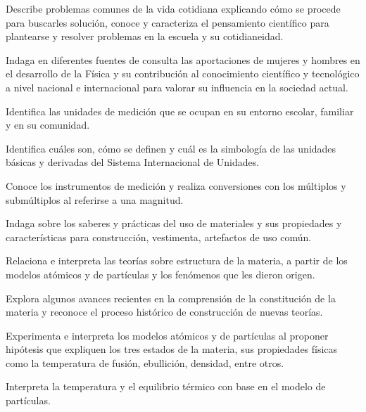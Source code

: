 \item Describe problemas comunes de la vida cotidiana explicando cómo se procede para buscarles solución, conoce y caracteriza el pensamiento científico para plantearse y resolver problemas en la escuela y su cotidianeidad.
\item Indaga en diferentes fuentes de consulta las aportaciones de mujeres y hombres en el desarrollo de la Física y su contribución al conocimiento científico y tecnológico a nivel nacional e internacional para valorar su influencia en la sociedad actual.
\item Identifica las unidades de medición que se ocupan en su entorno escolar, familiar y en su comunidad.
\item Identifica cuáles son, cómo se definen y cuál es la simbología de las unidades básicas y derivadas del Sistema Internacional de Unidades.
\item Conoce los instrumentos de medición y realiza conversiones con los múltiplos y submúltiplos al referirse a una magnitud.
\item Indaga sobre los saberes y prácticas del uso de materiales y sus propiedades y características para construcción, vestimenta, artefactos de uso común.
\item Relaciona e interpreta las teorías sobre estructura de la materia, a partir de los modelos atómicos y de partículas y los fenómenos que les dieron origen.
\item Explora algunos avances recientes en la comprensión de la constitución de la materia y reconoce el proceso histórico de construcción de nuevas teorías.
\item Experimenta e interpreta los modelos atómicos y de partículas al proponer hipótesis que expliquen los tres estados de la materia, sus propiedades físicas como la temperatura de fusión, ebullición, densidad, entre otros.
\item Interpreta la temperatura y el equilibrio térmico con base en el modelo de partículas.
